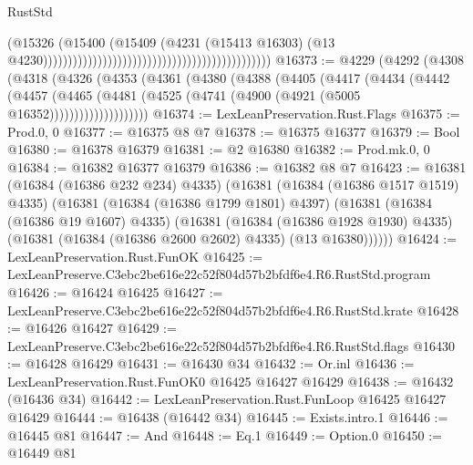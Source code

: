 \begin{lexlean}{RustStd}
\begin{coremodule}
                                                                                      (@15326
                                                                                        (@15400
                                                                                          (@15409
                                                                                            (@4231
                                                                                              (@15413
                                                                                                @16303)
                                                                                              (@13
                                                                                                @4230))))))))))))))))))))))))))))))))))))))))))))))
@16373 := @4229
    (@4292
      (@4308
        (@4318
          (@4326
            (@4353
              (@4361
                (@4380
                  (@4388
                    (@4405
                      (@4417
                        (@4434
                          (@4442
                            (@4457
                              (@4465
                                (@4481 (@4525 (@4741 (@4900 (@4921 (@5005 @16352))))))))))))))))))))
@16374 := LexLeanPreservation.Rust.Flags
@16375 := Prod.{0, 0}
@16377 := @16375 @8 @7
@16378 := @16375 @16377
@16379 := Bool
@16380 := @16378 @16379
@16381 := @2 @16380
@16382 := Prod.mk.{0, 0}
@16384 := @16382 @16377 @16379
@16386 := @16382 @8 @7
@16423 := @16381
    (@16384 (@16386 @232 @234) @4335)
    (@16381
      (@16384 (@16386 @1517 @1519) @4335)
      (@16381
        (@16384 (@16386 @1799 @1801) @4397)
        (@16381
          (@16384 (@16386 @19 @1607) @4335)
          (@16381
            (@16384 (@16386 @1928 @1930) @4335)
            (@16381 (@16384 (@16386 @2600 @2602) @4335) (@13 @16380))))))
@16424 := LexLeanPreservation.Rust.FunOK
@16425 := LexLeanPreserve.C3ebc2be616e22c52f804d57b2bfdf6e4.R6.RustStd.program
@16426 := @16424 @16425
@16427 := LexLeanPreserve.C3ebc2be616e22c52f804d57b2bfdf6e4.R6.RustStd.krate
@16428 := @16426 @16427
@16429 := LexLeanPreserve.C3ebc2be616e22c52f804d57b2bfdf6e4.R6.RustStd.flags
@16430 := @16428 @16429
@16431 := @16430 @34
@16432 := Or.inl
@16436 := LexLeanPreservation.Rust.FunOK0 @16425 @16427 @16429
@16438 := @16432 (@16436 @34)
@16442 := LexLeanPreservation.Rust.FunLoop @16425 @16427 @16429
@16444 := @16438 (@16442 @34)
@16445 := Exists.intro.{1}
@16446 := @16445 @81
@16447 := And
@16448 := Eq.{1}
@16449 := Option.{0}
@16450 := @16449 @81

\end{coremodule}
\end{lexlean}
